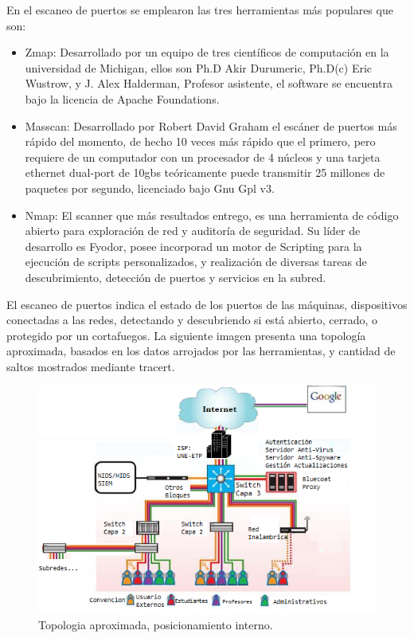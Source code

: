 \documentclass[jou,apacite]{apa6}   %
\begin{document}
En el escaneo de puertos se emplearon las tres herramientas más populares que son:
\begin{itemize}
\item Zmap: Desarrollado por un equipo de tres científicos de computación en la universidad de Michigan, ellos son Ph.D  Akir Durumeric, Ph.D(c) Eric Wustrow, y J. Alex Halderman, Profesor asistente, el software se encuentra bajo la licencia de Apache Foundations.
\item Masscan: Desarrollado por Robert David Graham el escáner de puertos más rápido del momento, de hecho 10 veces más rápido que el primero,  pero requiere de un computador con un procesador de 4 núcleos y una tarjeta ethernet dual-port de 10gbs teóricamente puede transmitir 25 millones de paquetes por segundo, licenciado bajo Gnu Gpl v3.
\item Nmap: El scanner que más resultados entrego,  es una herramienta de código abierto para exploración de red y auditoría de seguridad. Su líder de desarrollo es Fyodor, posee incorporad un motor de Scripting para  la ejecución de scripts personalizados, y  realización de diversas tareas de descubrimiento, detección de puertos y servicios en la subred.
\end{itemize}
El escaneo de puertos indica el estado de los puertos de las máquinas, dispositivos conectadas a  las redes, detectando y descubriendo si está abierto, cerrado, o protegido por un  cortafuegos. 
La siguiente imagen presenta una topología aproximada, basados en los datos arrojados por las herramientas, y cantidad de saltos mostrados mediante tracert.

\begin{figure}[htb]
\centering
\includegraphics[scale=0.6]{images/topologia.png}
\caption{Topologia aproximada, posicionamiento interno.} \label{fig:topologiared}
\end{figure}
\end{document}
